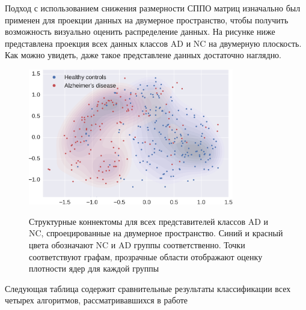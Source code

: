 \newpage Подход с использованием снижения размерности СППО матриц изначально был применен для проекции данных на двумерное пространство, чтобы получить возможность визуально оценить распределение данных. На рисунке ниже представлена проекция всех данных классов AD и NC на двумерную плоскость. Как можно увидеть, даже такое представлене данных достаточно наглядно.

\begin{figure}[h!]
\centering
\includegraphics[width=0.8\textwidth]{img/dr.pdf}\label{fig:dr}
\caption{Структурные коннектомы для всех представителей классов AD и NC, спроецированные на двумерное пространство. Синий и красный цвета обозначают NC и AD группы соответственно. Точки соответствуют графам, прозрачные области отображают оценку плотности ядер для каждой группы}
\end{figure}

Следующая таблица содержит сравнительные результаты классификации всех четырех алгоритмов, рассматривавшихся в работе

